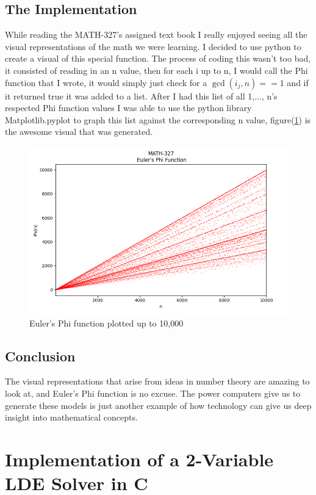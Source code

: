 \documentclass{article}
\begin{document}
\subsection{The Implementation}
While reading the MATH-327's assigned text book I really enjoyed seeing all the visual representations of the math we were learning. 
I decided to use python to create a visual of this special function. The process of coding this wasn't too bad, it consisted of reading in
an n value, then for each i up to n, I would call the Phi function that I wrote, it would simply just check for a $\gcd(i_j, n) == 1$ and if 
it returned true it was added to a list. After I had this list of all 1,..., n's respected Phi function values I was able to use the python library
Matplotlib.pyplot to graph this list against the corresponding n value, figure(\ref{fig:PhiPlot}) is the awesome visual that was generated.\\
\begin{figure}
  \centering
  \includegraphics[scale=.4]{PHI.png}
  \caption{Euler's Phi function plotted up to 10,000}
  \label{fig:PhiPlot}
\end{figure}
\subsection{Conclusion}
The visual representations that arise from ideas in number theory are amazing to look at, and Euler's Phi function is no excuse. The power computers 
give us to generate these models is just another example of how technology can give us deep insight into mathematical concepts.

\section{Implementation of a 2-Variable LDE Solver in C}
\end{document}
